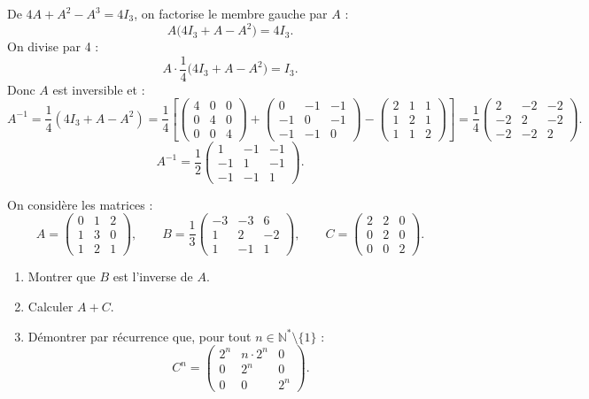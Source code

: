 \begin{solution}
	De $4A + A^2 - A^3 = 4I_3$, on factorise le membre gauche par $A$ :
	\[
	A\bigl(4I_3 + A - A^2\bigr) = 4I_3.
	\]
	On divise par 4 :
	\[
	A \cdot \frac{1}{4}\bigl(4I_3 + A - A^2\bigr) = I_3.
	\]
	Donc $A$ est inversible et :
	\[
	A^{-1} = \frac{1}{4}(4I_3 + A - A^2)
	= \frac{1}{4}\left[
	\begin{pmatrix}4&0&0\\0&4&0\\0&0&4\end{pmatrix}
	+ \begin{pmatrix}0&-1&-1\\-1&0&-1\\-1&-1&0\end{pmatrix}
	- \begin{pmatrix}2&1&1\\1&2&1\\1&1&2\end{pmatrix}
	\right]
	= \frac{1}{4}\begin{pmatrix}2&-2&-2\\-2&2&-2\\-2&-2&2\end{pmatrix}.
	\]
	\[
	\boxed{A^{-1} = \frac{1}{2}\begin{pmatrix}1&-1&-1\\-1&1&-1\\-1&-1&1\end{pmatrix}.}
	\]
\end{solution}

\begin{exercice}{\etoilepleine\etoilepleine\etoilevide}
	On considère les matrices :
	\[
	A = \begin{pmatrix}0&1&2\\1&3&0\\1&2&1\end{pmatrix}, \qquad
	B = \frac{1}{3}\begin{pmatrix}-3&-3&6\\1&2&-2\\1&-1&1\end{pmatrix}, \qquad
	C = \begin{pmatrix}2&2&0\\0&2&0\\0&0&2\end{pmatrix}.
	\]
	\begin{enumerate}
		\item Montrer que $B$ est l'inverse de $A$.
		\item Calculer $A+C$.
		\item Démontrer par récurrence que, pour tout $n\in\mathbb{N}^*\setminus\{1\}$ :
		\[
		C^n = \begin{pmatrix}2^n & n\cdot 2^n & 0\\0&2^n&0\\0&0&2^n\end{pmatrix}.
		\]
	\end{enumerate}
\end{exercice}

